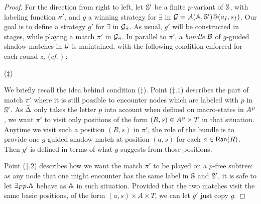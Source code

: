 \begin{proof}
For the direction from right to left, let $\mathbb{S}'$ be a finite $p$-variant of
$\mathbb{S}$, with labeling function $\kappa'$, and $g$ a winning strategy for $\exists$ in $\mathcal{G} = \mathcal{A}(\mathbb{A},\mathbb{S}')@(a_I,s_I)$. Our goal is to define a strategy $g'$ for $\exists$ in $\mathcal{G_{\exists}}$. As usual, $g'$ will be constructed in stages, while playing a match $\pi'$ in $\mathcal{G_{\exists}}$. In parallel to $\pi'$, a \emph{bundle} $\mathcal{B}$ of $g$-guided shadow matches in $\mathcal{G}$ is maintained, with the following condition enforced for each round $z_i$ (\emph{cf.} \cite[Prop.~ 3.12]{Zanasi:Thesis:2012}) :
\smallskip
\begin{center}
\hspace*{0.3cm}($\ddag$)
\end{center}
\smallskip
We briefly recall the idea behind condition ($\ddag$). Point ($\ddag.1$) describes the part of match $\pi'$ where it is still possible to encounter nodes which are labeled with $p$ in $\mathbb{S}'$. As $\widetilde{\Delta}$ only takes the letter $p$ into account when defined on macro-states in $A^{\wp}$, we want $\pi'$ to visit only positions of the form $(R,s) \in A^{\wp} \times T$ in that situation. Anytime we visit such a position $(R,s)$ in $\pi'$, the role of the bundle is to provide one $g$-guided shadow match at position $(a,s)$ for each $a \in \mathsf{Ran}(R)$.
Then $g'$ is defined in terms of what $g$ suggests from those positions.

 Point ($\ddag.2$) describes how we want the match $\pi'$ to be
 played on a $p$-free subtree: as any node that one might encounter has the same label in $\mathbb{S}$ and $\mathbb{S}'$,
it is safe to let ${{\exists}_F p}.\mathbb{A}$ behave as $\mathbb{A}$ in such situation. Provided that the two matches visit the same basic positions, of the form $(a,s)\times A \times T$, we can let $g'$ just copy $g$.


\end{proof}
